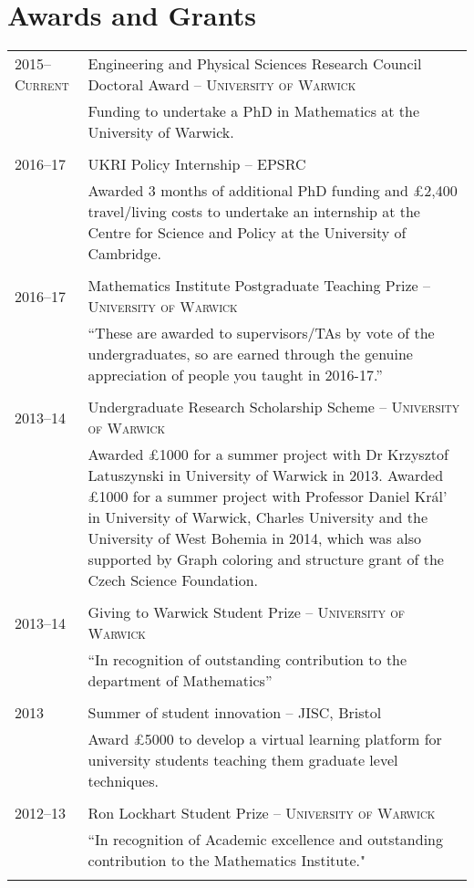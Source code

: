 \documentclass[a4paper,10pt]{article}
\begin{document}
\section{Awards and Grants}
\begin{tabular}{p{2.25cm}|p{15cm}}
	\textsc{2015--Current}& Engineering and Physical Sciences Research Council Doctoral Award -- \textsc{University of Warwick}\\&\footnotesize{Funding to undertake a PhD in Mathematics at the University of Warwick.}\\\multicolumn{2}{c}{} \\
	\textsc{2016--17}& UKRI Policy Internship -- \textsc{EPSRC}\\&\footnotesize{Awarded 3 months of additional PhD funding and £2,400 travel/living costs to undertake an internship at the Centre for Science and Policy at the University of Cambridge.}\\\multicolumn{2}{c}{} \\
	\textsc{2016--17}& Mathematics Institute Postgraduate Teaching Prize -- \textsc{University of Warwick}\\&\footnotesize{``These are awarded to supervisors/TAs by vote of the undergraduates, so are earned through the genuine appreciation of people you taught in 2016-17.”}\\\multicolumn{2}{c}{} \\
	\textsc{2013--14}& Undergraduate Research Scholarship Scheme -- \textsc{University of Warwick}\\&\footnotesize{Awarded £1000 for a summer project with Dr Krzysztof Latuszynski in University of Warwick in 2013. Awarded £1000 for a summer project with Professor Daniel Král' in University of Warwick, Charles University and the University of West Bohemia in 2014, which was also supported by Graph coloring and structure grant of the Czech Science Foundation.}\\\multicolumn{2}{c}{} \\
	\textsc{2013--14}& Giving to Warwick Student Prize -- \textsc{University of Warwick}\\&\footnotesize{``In recognition of outstanding contribution to the department of Mathematics”}\\\multicolumn{2}{c}{} \\
	\textsc{2013}& Summer of student innovation -- \textsc{JISC}, Bristol\\&\footnotesize{Award £5000 to develop a virtual learning platform for university students teaching them graduate level techniques.}\\\multicolumn{2}{c}{} \\
	\textsc{2012--13}& Ron Lockhart Student Prize -- \textsc{University of Warwick}\\&\footnotesize{``In recognition of Academic excellence and outstanding contribution to the Mathematics Institute."}\\\multicolumn{2}{c}{} \\
\end{tabular}
\end{document}
